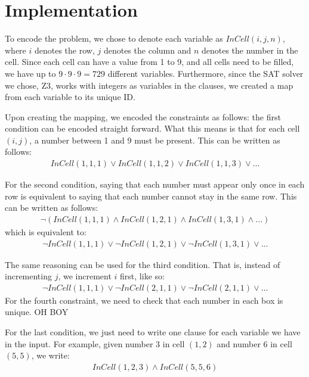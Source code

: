 \documentclass[12pt,a4paper]{article}
\begin{document}
\section*{Implementation}
To encode the problem, we chose to denote each variable as $InCell(i,j,n)$, where $i$ denotes the row, $j$ denotes the column and $n$ denotes the number in the cell.
Since each cell can have a value from 1 to 9, and all cells need to be filled, we have up to $9\cdot9\cdot9 = 729$ different variables.
Furthermore, since the SAT solver we chose, Z3, works with integers as variables in the clauses, we created a map from each variable to its unique ID.

Upon creating the mapping, we encoded the constraints as follows: the first condition can be encoded straight forward. What this means is that for each cell $(i,j)$, a number between 1 and 9 must be present. This can be written as follows:
\begin{align*}
  InCell(1,1,1) \vee InCell(1,1,2) \vee InCell(1,1,3) \vee ...
\end{align*}

For the second condition, saying that each number must appear only once in each row is equivalent to saying that each number cannot stay in the same row. This can be written as follows:
\begin{align*}
  \neg(InCell(1,1,1) \wedge InCell(1,2,1) \wedge InCell(1,3,1) \wedge ...)
\end{align*}
which is equivalent to:
\begin{align*}
  \neg InCell(1,1,1) \vee \neg InCell(1,2,1) \vee \neg InCell(1,3,1) \vee ...
\end{align*}

The same reasoning can be used for the third condition. That is, instead of incrementing $j$, we increment $i$ first, like so:
\begin{align}
  \neg InCell(1,1,1) \vee \neg InCell(2,1,1) \vee \neg InCell(2,1,1) \vee ...
\end{align}
For the fourth constraint, we need to check that each number in each  box is unique. OH BOY

For the last condition, we just need to write one clause for each variable we have in the input. For example, given number 3 in cell $(1,2)$ and number 6 in cell $(5,5)$, we write:
\begin{align}
  InCell(1,2,3) \wedge InCell(5,5,6)
\end{align}
\end{document}
